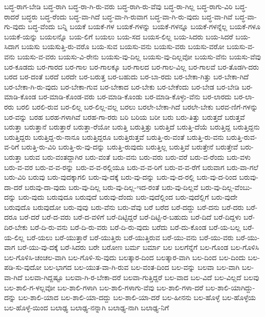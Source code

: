 {ಬದ್ಧ-ರಾಗ-ಬೇಡಿ
ಬದ್ಧ-ರಾಗಿ
ಬದ್ಧ-ರಾ-ಗಿ-ರು-ವರು
ಬದ್ಧ-ರಾಗಿ-ರು-ವೆವು
ಬದ್ಧ-ರಾ-ಗಿಲ್ಲ
ಬದ್ಧ-ರಾಗು-ವಿರಿ
ಬದ್ಧ-ರಾದರೆ
ಬದ್ಧರು
ಬದ್ಧ-ರೆಂದು
ಬದ್ಧ-ವಾ-ಗಿದೆ
ಬದ್ಧ-ವಾ-ಗಿ-ರುವಾಗ
ಬದ್ಧ-ವಾ-ಗಿ-ರು-ವುದು
ಬದ್ಧ-ವಾ-ಗಿವೆ
ಬದ್ಧ-ವಾ-ಗು-ವುದು
ಬದ್ಧ-ವೆಂದು
ಬನ್ನಿ
ಬಯಕೆ
ಬಯಕೆ-ಗಳ
ಬಯಕೆ-ಗಳನ್ನು
ಬಯಕೆ-ಗಳನ್ನೂ
ಬಯಕೆ-ಗಳನ್ನೆಲ್ಲ
ಬಯಕೆ-ಗಳೂ
ಬಯಕೆ-ಯನ್ನು
ಬಯಲನ್ನೊ
ಬಯ-ಲಿಗೆ
ಬಯಲು
ಬಯ-ಸದ
ಬಯಸ-ಲಿಲ್ಲ
ಬಯ-ಸಿದರು
ಬಯ-ಸಿದರೆ
ಬಯ-ಸಿದಾಗ
ಬಯಸು
ಬಯಸುತ್ತಿ-ರು-ವರೊ
ಬಯ-ಸುವ
ಬಯಸು-ವನು
ಬಯಸು-ವರು
ಬಯಸು-ವರೋ
ಬಯಸು-ವ-ವನು
ಬಯಸು-ವ-ವರು
ಬಯಸು-ವಿ-ರೇನು
ಬಯಸು-ವು-ದಿಲ್ಲ
ಬಯಸು-ವು-ದಿಲ್ಲವೋ
ಬಯಸು-ವೆನು
ಬಯಸು-ವೆವು
ಬರ-ಕೂಡದು
ಬರ-ಗಾರದ
ಬರ-ಗಾಲ
ಬರ-ಗಾಲಕ್ಕೂ
ಬರ-ಗಾಲದ
ಬರ-ಗಾಲ-ವಿಲ್ಲ
ಬರ-ಗಾಲವೆ
ಬರ-ತೊಡಗಿ-ದರು
ಬರದ
ಬರ-ದಂತೆ
ಬರದೆ
ಬರದೇ
ಬರ-ಬರುತ್ತ
ಬರ-ಬಹುದು
ಬರ-ಬಾ-ರದು
ಬರ-ಬೇಕಾ-ಗಿತ್ತು
ಬರ-ಬೇಕಾ-ಗಿದೆ
ಬರ-ಬೇಕಾ-ಗಿ-ರು-ವುದು
ಬರ-ಬೇಕಾ-ಗುವ
ಬರ-ಬೇಕಾದ
ಬರ-ಬೇಕು
ಬರ-ಬೇಕೆಂದು
ಬರ-ಬೇಡ
ಬರ-ಬೇಡಿ
ಬರ-ಮಾಡಿ-ಕೊಂಡ
ಬರ-ಮಾಡಿ-ಕೊಂಡ-ವರು
ಬರ-ಮಾಡಿ-ಕೊಂಡು
ಬರ-ಮಾಡಿ-ಕೊಳ್ಳು-ವೆನು
ಬರ-ಲಾರದು
ಬರ-ಲಾ-ರರು
ಬರಲಿ
ಬರಲಿ-ರುವ
ಬರ-ಲಿಲ್ಲ
ಬರ-ಲಿಲ್ಲ-ವಲ್ಲ
ಬರಲು
ಬರಲೇ-ಬೇಕಾ-ಗಿದೆ
ಬರಲೇ-ಬೇಕು
ಬರವ-ಣಿಗೆ-ಗಳನ್ನು
ಬರ-ವನ್ನು
ಬರಹ
ಬರಹ-ಗಳಾಗಿವೆ
ಬರಹ-ಗಾ-ರರು
ಬರಿ
ಬರಿಯ
ಬರೀ
ಬರು
ಬರು-ತಿತ್ತು
ಬರುತ್ತದೆ
ಬರುತ್ತವೆ
ಬರುತ್ತಾ
ಬರುತ್ತಾನೆ
ಬರುತ್ತಾರೆ
ಬರುತ್ತಾ-ರೆಯೋ
ಬರುತ್ತಿ
ಬರುತ್ತಿತ್ತು
ಬರುತ್ತಿದೆ
ಬರುತ್ತಿ-ದೆಯೆ
ಬರುತ್ತಿದ್ದ
ಬರುತ್ತಿದ್ದನು
ಬರುತ್ತಿದ್ದರು
ಬರುತ್ತಿದ್ದ-ರು-ನಾನೂ
ಬರುತ್ತಿದ್ದರೂ
ಬರುತ್ತಿರುತ್ತವೆ
ಬರುತ್ತಿ-ರು-ವಂತೆ
ಬರುತ್ತಿ-ರು-ವನು
ಬರುತ್ತಿ-ರುವ-ವ-ರಿಗೆ
ಬರುತ್ತಿ-ರು-ವಿರಿ
ಬರುತ್ತಿ-ರು-ವು-ದನ್ನು
ಬರುತ್ತಿ-ರುವುದು
ಬರುತ್ತಿಲ್ಲ
ಬರುತ್ತಿವೆ
ಬರುತ್ತೇನೆ
ಬರುತ್ತೇವೆ
ಬರು-ಬರುತ್ತಾ
ಬರುವ
ಬರು-ವಂತದ್ದಾಗಿರ
ಬರು-ವಂತೆ
ಬರು-ವನು
ಬರು-ವರು
ಬರು-ವರೆ
ಬರು-ವ-ರೆಂದು
ಬರು-ವಳು
ಬರು-ವ-ವರ
ಬರು-ವ-ವ-ರನ್ನು
ಬರು-ವ-ವ-ರಲ್ಲಿಯೂ
ಬರು-ವ-ವ-ರಿಗೆ
ಬರು-ವ-ವ-ರೆಗೆ
ಬರುವಾಗ
ಬರು-ವಾ-ಗಲೆ
ಬರು-ವಿರಿ
ಬರುವು
ಬರು-ವುದಕ್ಕಾಗಲಿ
ಬರು-ವು-ದಕ್ಕೆ
ಬರು-ವು-ದನ್ನು
ಬರು-ವು-ದ-ರಲ್ಲಿ
ಬರು-ವು-ದ-ರಿಂದ
ಬರುವು-ದಾ-ದರೆ
ಬರುವು-ದಾ-ವುದು
ಬರು-ವು-ದಿಲ್ಲ
ಬರು-ವು-ದಿಲ್ಲ-ಇದ-ರಂತೆ
ಬರು-ವು-ದಿಲ್ಲವೆ
ಬರು-ವು-ದಿಲ್ಲ-ವೆಂಬು-ದನ್ನು
ಬರು-ವುದು
ಬರುವುದೂ
ಬರುವುದೆ
ಬರುವು-ದೆಂದು
ಬರು-ವುದೆಲ್ಲಿಂದ
ಬರು-ವುದೆಲ್ಲಿಗೆ
ಬರು-ವುದೇ
ಬರುವುದೊ
ಬರುವುದೋ
ಬರು-ವುವು
ಬರು-ವೆನು
ಬರು-ವೆವು
ಬರೆ
ಬರೆದ
ಬರೆ-ದದ್ದು
ಬರೆ-ದನು
ಬರೆ-ದರು
ಬರೆ-ದರೂ
ಬರೆ-ದರೆ
ಬರೆ-ದ-ವರು
ಬರೆ-ದ-ವಳಿಗೆ
ಬರೆ-ದಿಟ್ಟಿದ್ದರೆ
ಬರೆ-ದಿಟ್ಟಿ-ರ-ಬಹುದು
ಬರೆ-ದಿದೆ
ಬರೆ-ದಿದ್ದಳು
ಬರೆ-ದಿರ-ಬೇಕು
ಬರೆ-ದಿ-ರು-ವನು
ಬರೆ-ದಿ-ರು-ವರು
ಬರೆ-ದಿ-ರು-ವುದು
ಬರೆದು
ಬರೆ-ದು-ಕೊಂಡ
ಬರೆ-ಯ-ಬಲ್ಲ
ಬರೆ-ಯ-ಲಿಲ್ಲ
ಬರೆ-ಯಲು
ಬರೆ-ಯುತ್ತಾರೆ
ಬರೆ-ಯುತ್ತಿರು
ಬರೆ-ಯುತ್ತಿರುವ
ಬರೆ-ಯು-ವನು
ಬರೆ-ಯು-ವರು
ಬರೆ-ಯು-ವಾಗ
ಬರೆ-ಯು-ವು-ದಕ್ಕೆ
ಬರೆ-ಸಿದರು
ಬರೇ
ಬರೋಣ
ಬರ್ಮ
ಬರ್ಮಾ
ಬಲ
ಬಲಗೆನ್ನೆಗೆ
ಬಲ-ಗೊಂಡ
ಬಲ-ಗೊಳಿಸಿ
ಬಲ-ಗೊಳಿಸಿ-ಚಂಚಲ-ವಾಗಿ
ಬಲ-ಗೊಳಿ-ಸು-ವುದು
ಬಲತ್ಕಾರ-ದಿಂದ
ಬಲತ್ಕಾರ-ವಾಗಿ
ಬಲ-ದಿಂದ
ಬಲ-ದಿಂದು
ಬಲ-ಪಡಿ-ಸು-ವುದೋ
ಬಲ-ಭಾಗದ
ಬಲ-ಯುತ-ವಾ-ಗಿ-ರುವ
ಬಲ-ವಂತ-ದಿಂದ
ಬಲ-ವನ್ನು
ಬಲವಾ
ಬಲ-ವಾಗಿ
ಬಲ-ವಾ-ಗಿದೆ
ಬಲವಾ-ಗಿದ್ದಷ್ಟೂ
ಬಲವಾ-ಗಿ-ರ-ಬೇಕಾ-ದರೆ
ಬಲವಾ-ಗುತ್ತಿದ್ದರೆ
ಬಲ-ವಾದ
ಬಲ-ವಿದೆ
ಬಲ-ವಿಲ್ಲದೆ
ಬಲವು
ಬಲ-ಶಾಲಿ-ಗ-ಳಲ್ಲವೋ
ಬಲ-ಶಾಲಿ-ಗಳಾಗಿ
ಬಲ-ಶಾಲಿ-ಗಳಾಗು-ವೆವು
ಬಲ-ಶಾಲಿ-ಗಳಾ-ದರೆ
ಬಲ-ಶಾಲಿ-ಯಾಗಿದ್ದು-ದನ್ನು
ಬಲ-ಶಾಲಿ-ಯಾದ
ಬಲ-ಶಾಲಿ-ಯಾ-ದದ್ದು
ಬಲ-ಶಾಲಿ-ಯಾ-ದರೆ
ಬಲ-ಹೀನನು
ಬಲ-ಹೊಳ್ಳೆ
ಬಲ-ಹೊಳ್ಳೆಯ
ಬಲ-ಹೊಳ್ಳೆ-ಯಿಂದ
ಬಲಾಢ್ಯ
ಬಲಾಢ್ಯ-ನನ್ನಾಗಿ
ಬಲಾಢ್ಯ-ನಾಗಿ
ಬಲಾಢ್ಯ-ನಿಗೆ
}
